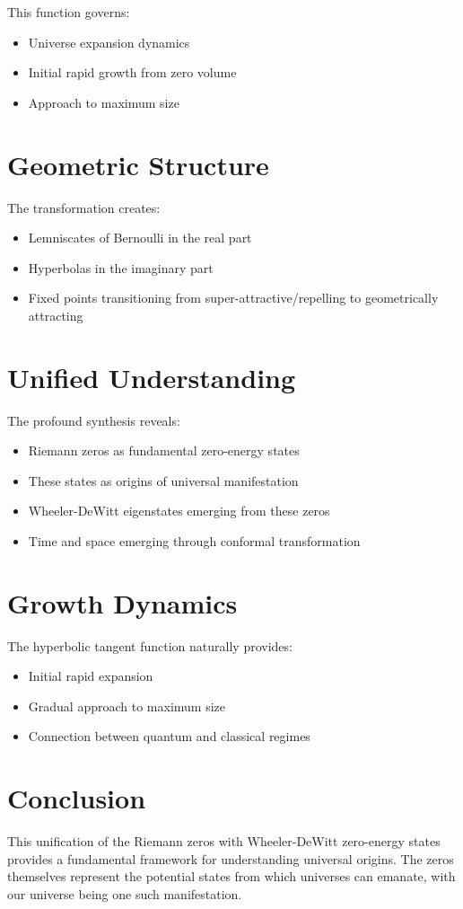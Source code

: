 \documentclass{article}
\begin{document}
This function governs:
\begin{itemize}
\item Universe expansion dynamics
\item Initial rapid growth from zero volume
\item Approach to maximum size
\end{itemize}

\section{Geometric Structure}
The transformation creates:
\begin{itemize}
\item Lemniscates of Bernoulli in the real part
\item Hyperbolas in the imaginary part
\item Fixed points transitioning from super-attractive/repelling to geometrically attracting
\end{itemize}

\section{Unified Understanding}
The profound synthesis reveals:
\begin{itemize}
\item Riemann zeros as fundamental zero-energy states
\item These states as origins of universal manifestation
\item Wheeler-DeWitt eigenstates emerging from these zeros
\item Time and space emerging through conformal transformation
\end{itemize}

\section{Growth Dynamics}
The hyperbolic tangent function naturally provides:
\begin{itemize}
\item Initial rapid expansion
\item Gradual approach to maximum size
\item Connection between quantum and classical regimes
\end{itemize}

\section{Conclusion}
This unification of the Riemann zeros with Wheeler-DeWitt zero-energy states provides a fundamental framework for understanding universal origins. The zeros themselves represent the potential states from which universes can emanate, with our universe being one such manifestation.
\end{document}
